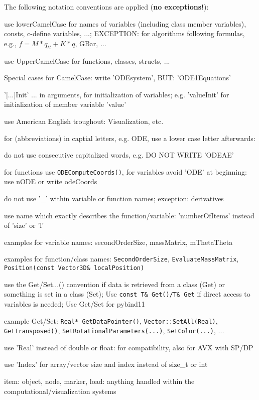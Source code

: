 %
The following notation conventions are applied ({\bf no exceptions!}):
\bi
		\item use lowerCamelCase for names of variables (including class member variables), consts, c-define variables, ...; EXCEPTION: for algorithms following formulas, e.g., $f = M*q_{tt} + K*q$, GBar, ...
		\item use UpperCamelCase for functions, classes, structs, ...
		\item Special cases for CamelCase: write 'ODEsystem', BUT: 'ODE1Equations'
		\item '[...]Init' ... in arguments, for initialization of variables; e.g. 'valueInit' for initialization of member variable 'value'
		\item use American English troughout: Visualization, etc.
		\item for (abbreviations) in captial letters, e.g. ODE, use a lower case letter afterwards:
		\item do not use consecutive capitalized words, e.g. DO NOT WRITE 'ODEAE'
		\item for functions use \texttt{ODEComputeCoords()}, for variables avoid 'ODE' at beginning: use nODE or write odeCoords
		\item do not use '\_' within variable or function names; exception: derivatives
		\item use name which exactly describes the function/variable: 'numberOfItems' instead of 'size' or 'l'
		\item examples for variable names: secondOrderSize, massMatrix, mThetaTheta
		\item examples for function/class names: \texttt{SecondOrderSize}, \texttt{EvaluateMassMatrix}, \texttt{Position(const Vector3D\& localPosition)}
		\item use the Get/Set...() convention if data is retrieved from a class (Get) or something is set in a class (Set); Use \texttt{const T\& Get()/T\& Get} if direct access to variables is needed; Use Get/Set for pybind11
		\item example Get/Set: \texttt{Real* GetDataPointer()}, \texttt{Vector::SetAll(Real)}, \texttt{GetTransposed()}, \texttt{SetRotationalParameters(...)}, \texttt{SetColor(...)}, ...
		\item use 'Real' instead of double or float: for compatibility, also for AVX with SP/DP
		\item use 'Index' for array/vector size and index instead of size\_t or int
		\item item: object, node, marker, load: anything handled within the computational/visualization systems
\ei

